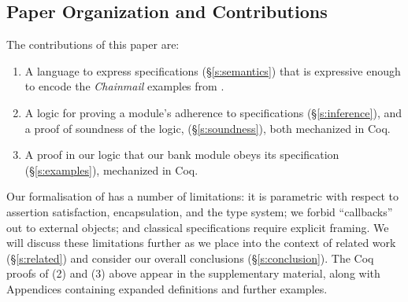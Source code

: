 \subsection{Paper Organization and Contributions}


%
The contributions of this paper are:\begin{enumerate}
 \item
A language to
express \Nec specifications (\S\ref{s:semantics}) that is  expressive
enough to encode the \emph{Chainmail} examples from . 
 \item
A logic for proving a module's adherence to 
 \Nec specifications (\S\ref{s:inference}), and a proof of soundness of the logic, (\S\ref{s:soundness}),
both mechanized in Coq. 
 \item
A proof in our logic %
  that our bank module obeys its \Nec specification (\S\ref{s:examples}), mechanized in Coq.
\end{enumerate}
 
Our formalisation of \Nec has a number of limitations: 
it is 
parametric with respect to assertion
satisfaction, encapsulation, and the type system;
we forbid 
``callbacks'' out to external objects; and
classical specifications require explicit framing.
We will discuss these limitations further as we place \Nec into the context of 
related work (\S\ref{s:related}) and consider our overall conclusions
(\S\ref{s:conclusion}). 
%
The Coq proofs of 
(2) and (3) above %
appear in the
supplementary material, along with Appendices containing expanded 
definitions and further examples.
